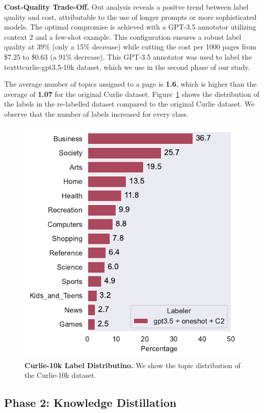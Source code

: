 \textbf{Cost-Quality Trade-Off.} 
Out analysis reveals a positve trend between label quality and cost, attributable to the use of longer prompts or more sophisticated models.
The optimal compromise is achieved with a GPT-3.5 annotator utilizing context 2 and a few-shot example. This configuration ensures a robust label quality at 39\% (only a 15\% decrease) while cutting the cost per 1000 pages from \$7.25 to \$0.63 (a 91\% decrease). 
This GPT-3.5 annotator was used to label the texttt{curlie-gpt3.5-10k} dataset, which we use in the second phase of our study.

The average number of topics assigned to a page is \textbf{1.6}, which is higher than the average of \textbf{1.07} for the original Curlie dataset. 
Figure~\ref{fig:label-distribution-comparison} shows the distribution of the labels in the re-labelled dataset compared to the original Curlie dataset.
We observe that the number of labels increased for every class.

\begin{figure}[!h]
    \centering
    \includegraphics[width=.8\columnwidth]{figures/curlie-label-distribution.pdf}
    \caption{\textbf{Curlie-10k Label Distributino.} We show the topic distribution of the Curlie-10k dataset.}
    \label{fig:label-distribution-comparison}
\end{figure}


\subsection*{Phase 2: Knowledge Distillation}

